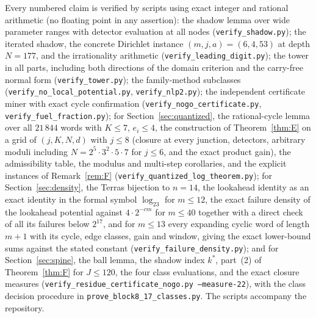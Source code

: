 \documentclass[11pt]{article}
\theoremstyle{definition}
\theoremstyle{remark}
\begin{document}
{\sloppy
Every numbered claim is verified by scripts using exact integer and
rational arithmetic (no floating point in any assertion): the shadow
lemma over wide parameter ranges with detector evaluation at all nodes
(\texttt{verify\_shadow.py}); the iterated shadow, the concrete
Dirichlet instance $(m,j,a)=(6,4,53)$ at depth $N=177$, and the
irrationality arithmetic (\texttt{verify\_leading\_digit.py}); the
tower in all parts, including both directions of the domain criterion
and the carry-free normal form
(\texttt{verify\_tower.py}); the family-method subclasses
(\texttt{verify\_no\_local\_potential.py}, \texttt{verify\_nlp2.py});
the independent certificate miner with exact cycle confirmation
(\texttt{verify\_nogo\_certificate.py},
\texttt{verify\_fuel\_fraction.py}); for Section~\ref{sec:quantized},
the rational-cycle lemma over all $21\,844$ words with $K\le7$,
$e_i\le4$, the construction of Theorem~\ref{thm:E} on a grid of
$(j,K,N,d)$ with $j\le8$ (closure at every junction, detectors,
arbitrary moduli including $N=2^{5}\cdot3^{2}\cdot5\cdot7$ for $j\le6$, and the
exact product gain), the admissibility table, the modulus and multi-step
corollaries, and the explicit instances of Remark~\ref{rem:F}
(\texttt{verify\_quantized\_log\_theorem.py}); for
Section~\ref{sec:density}, the Terras bijection to $n=14$, the lookahead
identity as an exact identity in the formal symbol $\log_23$ for
$m\le12$, the exact failure density of the lookahead potential against
$4\cdot2^{-cm}$ for $m\le40$ together with a direct check of all its
failures below $2^{17}$, and for $m\le13$ every expanding cyclic word of
length $m+1$ with its cycle, edge classes, gain and window, giving the
exact lower-bound sums against the stated constant
(\texttt{verify\_failure\_density.py}); and for Section~\ref{sec:spine}, the
ball lemma, the shadow index $k^{*}$, part~(2) of Theorem~\ref{thm:F} for
$J\le120$, the four class evaluations, and the exact closure measures
(\texttt{verify\_residue\_certificate\_nogo.py --measure-22}), with the
class decision procedure in \texttt{prove\_block8\_17\_classes.py}. The
scripts accompany the repository.
\par}
\end{document}
